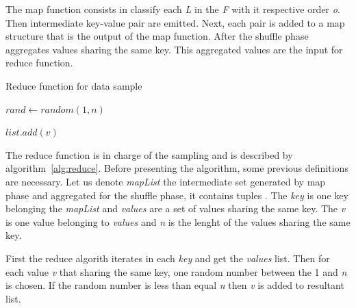 The map function consists in classify each {\it L} in the {\it F} with
it respective order {\it o}. Then intermediate key-value pair 
are emitted. Next, each pair is added to a map structure that is the output of
the map function. After the shuffle phase aggregates values sharing the same key.
This aggregated values are the input for reduce function.

\begin{algorithm}
		\caption{Reduce function for data sample \label{alg:reduce}}


		 {

			 {
				$rand \leftarrow random(1, n)$

				 {
					$list.add(v)$
				}

			}

		}

\end{algorithm}

The reduce function is in charge of the sampling and is described by algorithm~\ref{alg:reduce}.
Before presenting the algorithm, some previous definitions are necessary. Let us
denote {\it mapList} the intermediate set generated by map phase and aggregated
for the shuffle phase, it contains tuples . The {\it key}
is one key belonging the {\it mapList} and {\it values} are a set of values sharing
the same key. The {\it v} is one value belonging to {\it values} and {\it n} is
the lenght of the values sharing the same key.

First the reduce algorith iterates in each {\it key} and get the {\it values}
list. Then for each value {\it v} that sharing the same key, one random number
between the 1 and {\it n} is chosen. If the random number is less than equal
{\it n} then {\it v} is added to resultant list. 
